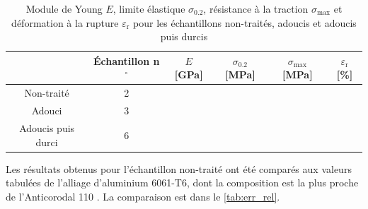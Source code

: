 \begin{table}[h]
    \centering
    \begin{tabular}{ |c||c|c|c|c|c| }
        \cline{2-6}
        \multicolumn{1}{c|}{} & Échantillon n$^\circ$ & \(E\) [GPa] & \(\sigma_{0.2}\) [MPa] & \(\sigma_{\textrm{max}}\) [MPa] & \(\varepsilon_{\textrm{r}}\) [\%] \\
        \hline
        \multirow{1}{4cm}{Non-traité}
        & 2 &  &  &  &  \\
        \hline
        \multirow{1}{4cm}{Adouci}
        & 3 &  &  &  &  \\
        \hline
        \multirow{1}{4cm}{Adoucis puis durci}
        & 6 &  &  &  &  \\
        \hline
    \end{tabular}
    \caption{Module de Young \(E\), limite élastique \(\sigma_{0.2}\), résistance à la traction \(\sigma_{\textrm{max}}\) et déformation à la rupture \(\varepsilon_{\textrm{r}}\) pour les échantillons non-traités, adoucis et adoucis puis durcis}
    \label{tab:results}
\end{table}

Les résultats obtenus pour l'échantillon non-traité ont été comparés aux valeurs tabulées de l'alliage d'aluminium 6061-T6, dont la composition est la plus proche de l'Anticorodal 110 \cite{alualualu}. La comparaison est dans le \autoref{tab:err_rel}.

